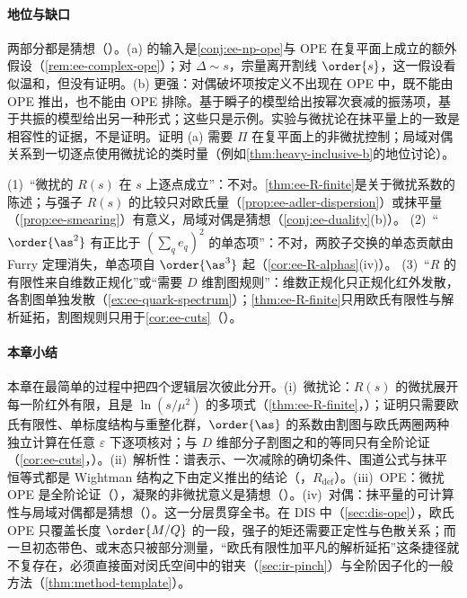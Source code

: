 \paragraph{地位与缺口}两部分都是猜想（\tagC）。(a) 的输入是\cref{conj:ee-np-ope}与 OPE 在复平面上成立的额外假设（\cref{rem:ee-complex-ope}）；对 $\Delta\sim s$，宗量离开割线 $\order{s}$，这一假设看似温和，但没有证明。(b) 更强：对偶破坏项按定义不出现在 OPE 中，既不能由 OPE 推出，也不能由 OPE 排除。基于瞬子的模型给出按幂次衰减的振荡项，基于共振的模型给出另一种形式；这些只是示例\cite{Shifman2000}。实验与微扰论在抹平量上的一致是相容性的证据，不是证明。证明 (a) 需要 $\Pi$ 在复平面上的非微扰控制；局域对偶关系到一切逐点使用微扰论的类时量（例如\cref{thm:heavy-inclusive-b}的地位讨论）。

\begin{remark}[常见误解]\label{rem:ee-misconceptions}
(1)~“微扰的 $R(s)$ 在 $s$ 上逐点成立”：不对。\cref{thm:ee-R-finite}是关于微扰系数的陈述；与强子 $R(s)$ 的比较只对欧氏量（\cref{prop:ee-adler-dispersion}）或抹平量（\cref{prop:ee-smearing}）有意义，局域对偶是猜想（\cref{conj:ee-duality}(b)）。
(2)~“$\order{\as^2}$ 有正比于 $(\sum_qe_q)^2$ 的单态项”：不对，两胶子交换的单态贡献由 Furry 定理消失，单态项自 $\order{\as^3}$ 起（\cref{cor:ee-R-alphas}(iv)）。
(3)~“$R$ 的有限性来自维数正规化”或“需要 $D$ 维割图规则”：维数正规化只正规化红外发散，各割图单独发散（\cref{ex:ee-quark-spectrum}）；\cref{thm:ee-R-finite}只用欧氏有限性与解析延拓，割图规则只用于\cref{cor:ee-cuts}（\tagA）。
\end{remark}

\paragraph{本章小结}本章在最简单的过程中把四个逻辑层次彼此分开。(i)~微扰论：$R(s)$ 的微扰展开每一阶红外有限，且是 $\ln(s/\mu^2)$ 的多项式（\cref{thm:ee-R-finite}，\tagR）；证明只需要欧氏有限性、单标度结构与重整化群，$\order{\as}$ 的系数由割图与欧氏两圈两种独立计算在任意 $\varepsilon$ 下逐项核对；与 $D$ 维部分子割图之和的等同只有全阶论证（\cref{cor:ee-cuts}，\tagA）。(ii)~解析性：谱表示、一次减除的确切条件、围道公式与抹平恒等式都是 Wightman 结构之下由定义推出的结论（\tagR，$R_{\mathrm{def}}$）。(iii)~OPE：微扰 OPE 是全阶论证（\tagA），凝聚的非微扰意义是猜想（\tagC）。(iv)~对偶：抹平量的可计算性与局域对偶都是猜想（\tagC）。这一分层贯穿全书。在 DIS 中（\cref{sec:dis-ope}），欧氏 OPE 只覆盖长度 $\order{M/Q}$ 的一段，强子的矩还需要正定性与色散关系；而一旦初态带色、或末态只被部分测量，“欧氏有限性加平凡的解析延拓”这条捷径就不复存在，必须直接面对闵氏空间中的钳夹（\cref{sec:ir-pinch}）与全阶因子化的一般方法（\cref{thm:method-template}）。
